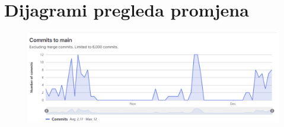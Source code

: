 					
		\eject
		\section*{Dijagrami pregleda promjena}
		
		\begin{figure}[H]
			\includegraphics[scale=0.3]{slike/commits1.PNG} %
			\centering
			\label{}
		\end{figure}
	
